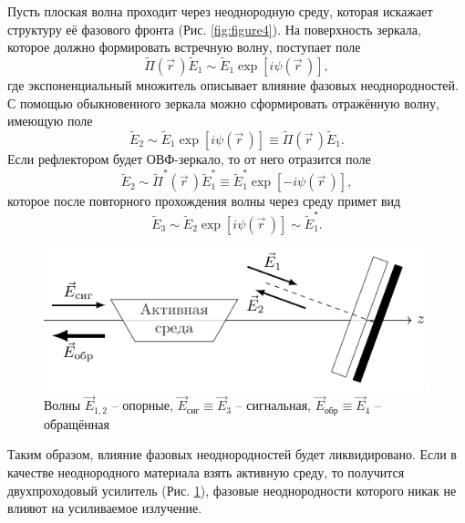 Пусть плоская волна проходит через неоднородную среду, которая
искажает структуру её фазового фронта (Рис. \ref{fig:figure4}). На поверхность зеркала, которое должно формировать встречную волну, поступает поле
\begin{equation}
	\label{eq:2.8}
	\tilde{\Pi}(\vec{r}\,) \tilde{E}_{1} \sim \tilde{E}_{1} \exp [i \psi(\vec{r}\,)],
\end{equation}
где экспоненциальный множитель описывает влияние фазовых неоднородностей. С помощью обыкновенного зеркала можно сформировать отражённую волну, имеющую поле
\begin{equation}
	\label{eq:2.8'}
	\tilde{E}_{2} \sim \tilde{E}_{1} \exp [i \psi(\vec{r}\,)] \equiv \tilde{\Pi}(\vec{r}\,) \tilde{E}_{1}.
\end{equation}
Если рефлектором будет ОВФ-зеркало, то от него отразится поле
\begin{equation}
	\label{eq:2.9}
	\tilde{E}_{2} \sim \tilde{\Pi}^{*}(\vec{r}\,) \tilde{E}_{1}^{*} \equiv \tilde{E}_{1}^{*} \exp [-i \psi(\vec{r}\,)],
\end{equation}
которое после повторного прохождения волны через среду примет вид
\begin{equation}
	\label{eq:2.10}
	\tilde{E}_{3} \sim \tilde{E}_{2} \exp [i \psi(\vec{r}\,)] \sim \tilde{E}_{1}^{*}.
\end{equation}
\begin{figure}[hb]
	\centering
	\includegraphics[scale=1.4]{fig/fig5.pdf}
	\caption{Волны $\vec{E}_{1,2}$ -- опорные, $\vec{E}_\text{сиг}\equiv\vec{E}_3$ -- сигнальная, $\vec{E}_\text{обр}\equiv\vec{E}_4$ -- обращённая}
	\label{fig:figure5}
\end{figure}
Таким образом, влияние фазовых неоднородностей будет ликвидировано. Если в качестве неоднородного материала взять активную среду, то получится двухпроходовый усилитель (Рис. \ref{fig:figure5}), фазовые неоднородности которого никак не влияют на усиливаемое излучение.





